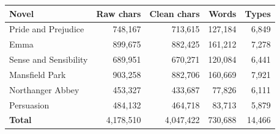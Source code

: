 \footnotesize
\begin{tabular}{lrrrr}
\toprule
Novel & Raw chars & Clean chars & Words & Types \\
\midrule
Pride and Prejudice & 748,167 & 713,615 & 127,184 & 6,849 \\
Emma & 899,675 & 882,425 & 161,212 & 7,278 \\
Sense and Sensibility & 689,951 & 670,271 & 120,084 & 6,441 \\
Mansfield Park & 903,258 & 882,706 & 160,669 & 7,921 \\
Northanger Abbey & 453,327 & 433,687 & 77,826 & 6,111 \\
Persuasion & 484,132 & 464,718 & 83,713 & 5,879 \\
\textbf{Total} & 4,178,510 & 4,047,422 & 730,688 & 14,466 \\
\bottomrule
\end{tabular}
